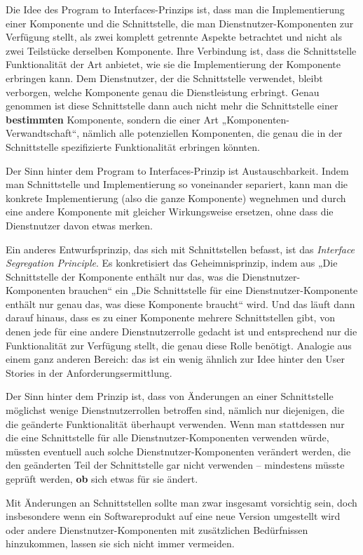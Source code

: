 \vspace{-0.1mm} %

Die Idee des Program to Interfaces-Prinzips ist, dass man die Implementierung einer Komponente und die Schnittstelle, die man Dienstnutzer-Komponenten zur Verfügung stellt, als zwei komplett getrennte Aspekte betrachtet und nicht als zwei Teilstücke derselben Komponente. Ihre Verbindung ist, dass die Schnittstelle Funktionalität der Art anbietet, wie sie die Implementierung der Komponente erbringen kann. Dem Dienstnutzer, der die Schnittstelle verwendet, bleibt verborgen, welche Komponente genau die Dienstleistung erbringt. Genau genommen ist diese Schnittstelle dann auch nicht mehr die Schnittstelle einer \textbf{bestimmten} Komponente, sondern die einer Art „Komponenten-Verwandtschaft“, nämlich alle potenziellen Komponenten, die genau die in der Schnittstelle spezifizierte Funktionalität erbringen könnten.
 
Der Sinn hinter dem Program to Interfaces-Prinzip ist Austauschbarkeit. Indem man Schnittstelle und Implementierung so voneinander separiert, kann man die konkrete Implementierung (also die ganze Komponente) wegnehmen und durch eine andere Komponente mit gleicher Wirkungsweise ersetzen, ohne dass die Dienstnutzer davon etwas merken. 

Ein anderes Entwurfsprinzip, das sich mit Schnittstellen befasst, ist das 
\textit{Interface \mbox{Segregation} Principle}. Es konkretisiert das Geheimnisprinzip, indem aus „Die 
\linebreak %
Schnittstelle der Komponente enthält nur das, was die Dienstnutzer-Komponenten brauchen“ ein „Die Schnittstelle für eine Dienstnutzer-Komponente enthält nur genau das, was diese Komponente braucht“ wird. Und das läuft dann darauf hinaus, dass es zu einer Komponente mehrere Schnittstellen gibt, von denen jede für eine andere Dienstnutzerrolle gedacht ist und entsprechend nur die Funktionalität zur Verfügung stellt, die genau diese Rolle benötigt. Analogie aus einem ganz anderen Bereich: das ist ein wenig ähnlich zur Idee hinter den User Stories in der Anforderungs\-ermittlung.

Der Sinn hinter dem Prinzip ist, dass von Änderungen an einer Schnittstelle möglichst wenige Dienstnutzerrollen betroffen sind, nämlich nur diejenigen, die die geänderte Funktionalität überhaupt verwenden. Wenn man stattdessen nur die eine Schnittstelle für alle Dienstnutzer-Komponenten verwenden würde, müssten eventuell auch solche Dienstnutzer-Komponenten verändert werden, die den geänderten Teil der Schnittstelle gar nicht verwenden – mindestens müsste geprüft werden, \textbf{ob} sich etwas für sie ändert.

Mit Änderungen an Schnittstellen sollte man zwar insgesamt vorsichtig sein, doch insbesondere wenn ein Softwareprodukt auf eine neue Version umgestellt wird oder andere Dienstnutzer-Komponenten mit zusätzlichen Bedürfnissen hinzukommen, lassen sie sich nicht immer vermeiden.